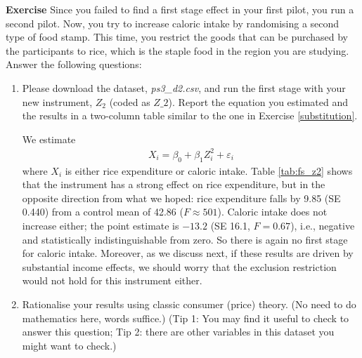 \documentclass[10pt]{article}
\newcounter{exercise}
\newenvironment{exercise}%
{%
	\refstepcounter{exercise}%
	\textbf{Exercise \theexercise}%
	}%
{
 \par\vspace{\baselineskip}%
\noindent\ignorespacesafterend
}
\begin{document}

\begin{exercise}\label{giffen}
	Since you failed to find a first stage effect in your first pilot, you run a second pilot. Now, you try to increase caloric intake by randomising a second type of food stamp. This time, you restrict the goods that can be purchased by the participants to rice, which is the staple food in the region you are studying. Answer the following questions:
	\begin{enumerate}
		\item Please download the dataset, \textit{ps3\_d2.csv}, and run the first stage with your new instrument, $ Z_{2} $ (coded as $ Z\_2 $). Report the equation you estimated and the results in a two-column table similar to the one in Exercise \ref{substitution}.

		\color{red}
		We estimate
		\begin{align*}
		X_i = \beta_{0} + \beta_{1}Z^2_i + \varepsilon_{i}
		\end{align*}
		where $ X_i $ is either rice expenditure or caloric intake. Table \ref{tab:fs_z2} shows that the instrument has a strong effect on rice expenditure, but in the opposite direction from what we hoped: rice expenditure falls by 9.85 (SE 0.440) from a control mean of 42.86 ($F \approx 501$). Caloric intake does not increase either; the point estimate is $-13.2$ (SE 16.1, $F = 0.67$), i.e., negative and statistically indistinguishable from zero. So there is again no first stage for caloric intake. Moreover, as we discuss next, if these results are driven by substantial income effects, we should worry that the exclusion restriction would not hold for this instrument either.

		
		\color{black}
		\item Rationalise your results using classic consumer (price) theory. (No need to do mathematics here, words suffice.) (Tip 1: You may find it useful to check \citet{jensen2008} to answer this question; Tip 2: there are other variables in this dataset you might want to check.)


\end{enumerate}
\end{exercise}
\end{document}
